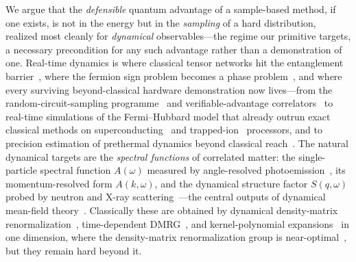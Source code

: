 We argue that the \emph{defensible} quantum advantage of a sample-based method, if one exists, is not in
the energy but in the \emph{sampling} of a hard distribution, realized most cleanly for
\emph{dynamical} observables---the regime our primitive targets, a necessary precondition for any such
advantage rather than a demonstration of one. Real-time dynamics is where classical tensor networks hit the
entanglement barrier~\cite{calabresecardy2005}, where the fermion sign problem becomes a phase
problem~\cite{troyerwiese2005}, and where every
surviving beyond-classical hardware demonstration now lives---from the random-circuit-sampling
programme~\cite{arute2019} and verifiable-advantage correlators~\cite{google_echoes} to real-time
simulations of the Fermi--Hubbard model that already outrun exact classical methods on
superconducting~\cite{googlefh2025} and trapped-ion~\cite{quantinuumfh2025} processors, and to
precision estimation of prethermal dynamics beyond classical
reach~\cite{qedma2026,algorithmiq2026}. The natural dynamical targets are the
\emph{spectral functions} of correlated matter: the single-particle spectral function $A(\omega)$
measured by angle-resolved photoemission~\cite{damascelli2003}, its momentum-resolved form
$A(k,\omega)$, and the dynamical structure factor $S(q,\omega)$ probed by neutron and X-ray
scattering~\cite{squires2012,ament2011}---the central outputs of dynamical mean-field theory~\cite{dmft1996}. Classically these
are obtained by dynamical density-matrix renormalization~\cite{jeckelmann2002,nocera2016},
time-dependent DMRG~\cite{whitefeiguin2004}, and kernel-polynomial expansions~\cite{kpm2006} in one
dimension, where the density-matrix renormalization group is near-optimal~\cite{whitedmrg1992,schollwock2011}, but
they remain hard beyond it.

